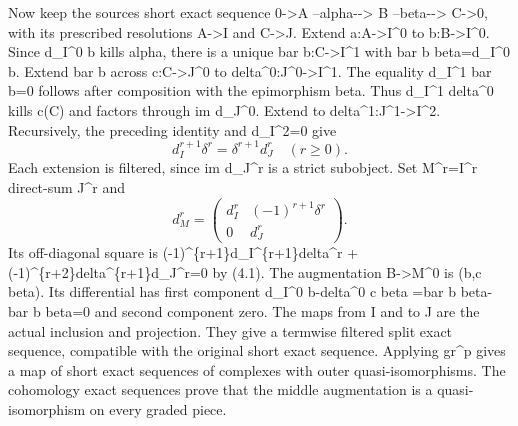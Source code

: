 Now keep the source\textquotesingle s short exact sequence 0\allowbreak{}->A --alpha-\allowbreak{}-> B --beta-\allowbreak{}-> C\allowbreak{}->0,\allowbreak{} with its prescribed resolutions A\allowbreak{}->I and C\allowbreak{}->J. Extend a:\allowbreak{}A\allowbreak{}->I\textasciicircum{}0 to b:\allowbreak{}B\allowbreak{}->I\textasciicircum{}0. Since d\_\allowbreak{}I\textasciicircum{}0 b kills alpha,\allowbreak{} there is a unique bar b:\allowbreak{}C\allowbreak{}->I\textasciicircum{}1 with bar b beta\allowbreak{}=d\_\allowbreak{}I\textasciicircum{}0 b. Extend bar b across c:\allowbreak{}C\allowbreak{}->J\textasciicircum{}0 to delta\textasciicircum{}0:\allowbreak{}J\textasciicircum{}0\allowbreak{}->I\textasciicircum{}1. The equality d\_\allowbreak{}I\textasciicircum{}1 bar b\allowbreak{}=0 follows after composition with the epimorphism beta. Thus d\_\allowbreak{}I\textasciicircum{}1 delta\^{}0 kills c(C)\allowbreak{} and factors through im d\_\allowbreak{}J\textasciicircum{}0. Extend to delta\textasciicircum{}1:\allowbreak{}J\textasciicircum{}1\allowbreak{}->I\textasciicircum{}2. Recursively,\allowbreak{} the preceding identity and d\_\allowbreak{}I\textasciicircum{}2\allowbreak{}=0 give \[
 d_I^{r+1}\delta^r=\delta^{r+1}d_J^r
 \quad(r\ge0).                                               \tag{4.1}
\] Each extension is filtered,\allowbreak{} since im d\_\allowbreak{}J\textasciicircum{}r is a strict subobject. Set M\textasciicircum{}r\allowbreak{}=I\textasciicircum{}r direct-sum J\^{}r and \[
 d_M^r=
 \begin{pmatrix}
 d_I^r&(-1)^{r+1}\delta^r\\
 0&d_J^r
 \end{pmatrix}.                                              \tag{4.2}
\] Its off-diagonal square is (-1)\allowbreak{}\textasciicircum{}\{r\allowbreak{}+1\}d\_\allowbreak{}I\textasciicircum{}\{r\allowbreak{}+1\}delta\textasciicircum{}r \allowbreak{}+(-1)\allowbreak{}\textasciicircum{}\{r\allowbreak{}+2\}delta\textasciicircum{}\{r\allowbreak{}+1\}d\_\allowbreak{}J\textasciicircum{}r\allowbreak{}=0 by (4.1)\allowbreak{}. The augmentation B\allowbreak{}->M\textasciicircum{}0 is (b,\allowbreak{}c beta)\allowbreak{}. Its differential has first component d\_\allowbreak{}I\textasciicircum{}0 b-delta\^{}0 c beta \allowbreak{}=bar b beta-bar b beta\allowbreak{}=0 and second component zero. The maps from I and to J are the actual inclusion and projection. They give a termwise filtered split exact sequence,\allowbreak{} compatible with the original short exact sequence. Applying gr\^{}p gives a map of short exact sequences of complexes with outer quasi-isomorphisms. The cohomology exact sequences prove that the middle augmentation is a quasi-isomorphism on every graded piece.


